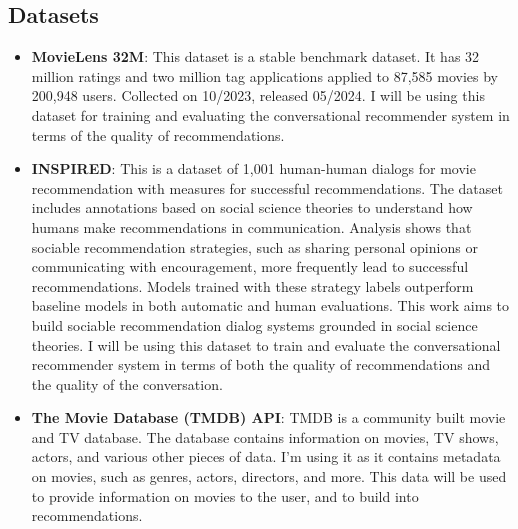 \subsection{Datasets}
\begin{itemize}
    \item \textbf{MovieLens 32M}: 
    This dataset\cite{10.1145/2827872} is a stable benchmark dataset. 
    It has 32 million ratings and two million tag applications applied to 87,585 movies by 200,948 users. Collected on 10/2023, released 05/2024.
    I will be using this dataset for training and evaluating the conversational recommender system in terms of the quality of recommendations.

    \item \textbf{INSPIRED}: 
    This is a dataset\cite{hayati-etal-2020-inspired} of 1,001 human-human dialogs for movie recommendation with measures for successful recommendations. 
    The dataset includes annotations based on social science theories to understand how humans make recommendations in communication. 
    Analysis shows that sociable recommendation strategies, such as sharing personal opinions or communicating with encouragement, 
    more frequently lead to successful recommendations. Models trained with these strategy labels outperform baseline models in both 
    automatic and human evaluations. This work aims to build sociable recommendation dialog systems grounded in social science theories.
    I will be using this dataset to train and evaluate the conversational recommender system in terms of both the quality of recommendations and the quality of the conversation.

    \item \textbf{The Movie Database (TMDB) API}: TMDB\cite{tmdb} is a community built movie and TV database. The database contains information on movies, TV shows, actors, and various other pieces of data.
    I'm using it as it contains metadata on movies, such as genres, actors, directors, and more. This data will be used to provide information on movies to the user, and to build into recommendations.

\end{itemize}




